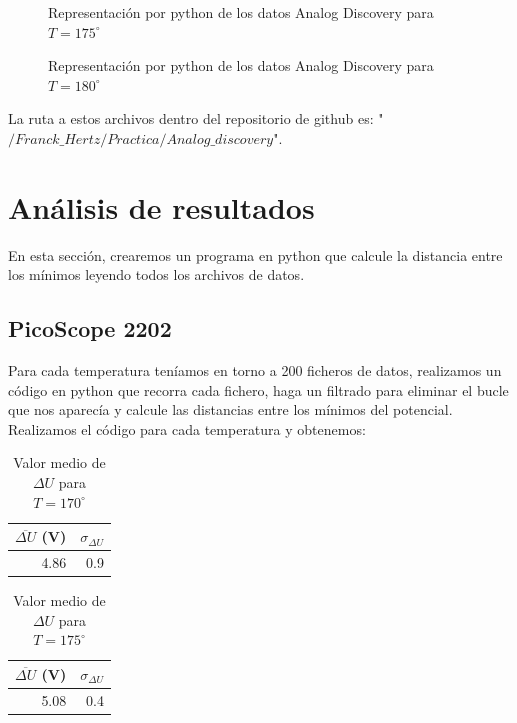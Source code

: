 \documentclass[11pt, a4paper, twocolumn]{article}
\begin{document}
\begin{figure}[h]
	\centering
	
	\caption{Representación por python de los datos Analog Discovery para $T=175^\circ$}
	\label{Pico175csv}
\end{figure}

\begin{figure}[h]
	\centering
	
	\caption{Representación por python de los datos Analog Discovery para $T=180^\circ$}
	\label{Pico180csv}
\end{figure}
\newpage
La ruta a estos archivos dentro del repositorio de 
github es: "$/Franck\_Hertz/Practica/Analog\_discovery$".

\section{Análisis de resultados}

En esta sección, crearemos un programa en python que calcule la distancia entre los 
mínimos leyendo todos los archivos de datos.

\subsection{PicoScope 2202}

Para cada temperatura teníamos en torno a 200 ficheros de datos, realizamos un
código en python que recorra cada fichero, haga un filtrado para eliminar 
el bucle que nos aparecía y calcule las distancias entre los mínimos del potencial.
Realizamos el código para cada temperatura y obtenemos:

\newpage

\begin{table}[h]
\centering   

\begin{tabular}{rr}
   $\overline{\Delta U}$ (V)&   $\sigma_{\Delta U}$ \\
\hline
             4.86 &                  0.9 \\
\hline
\end{tabular}
\label{tab: Tabla170}
\caption{Valor medio de $\Delta U$ para $T = 170^\circ$}
\end{table}

\begin{table}[h]
\centering   

\begin{tabular}{rr}

   $\overline{\Delta U}$ (V) &   $\sigma_{\Delta U}$ \\
\hline
             5.08 &                0.4 \\
\hline
\end{tabular}
\label{tab: Tabla175}
\caption{Valor medio de $\Delta U$ para $T = 175^\circ$}
\end{table}
\end{document}
